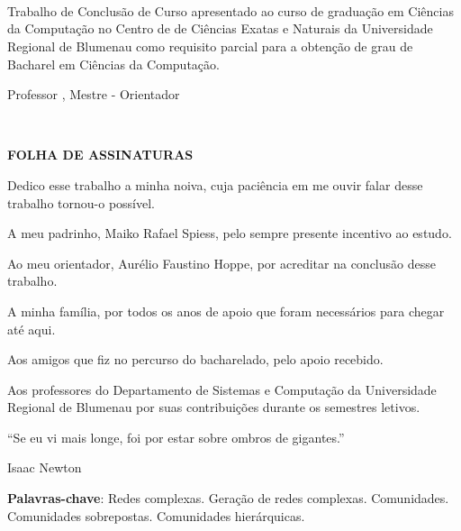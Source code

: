 \documentclass[notes.tex]{subfiles}
\renewcommand{\imprimircapa}{

    \DoubleSpacing

    \begin{centering}

        {\bfseries \MakeUppercase{\imprimirinstituicao}\par}
    
        \vspace*{\fill} \vspace*{\fill} \vspace*{\fill} \vspace*{\fill}
        \vspace*{\fill} \vspace*{\fill} \vspace*{\fill}
    
        {\bfseries\LARGE\MakeUppercase{\imprimirtitulo}}\\
    
        \vspace*{\fill}

        \begin{flushright}
            \bfseries \MakeUppercase{\imprimirautor}
        \end{flushright}   

        \vspace*{\fill} \vspace*{\fill} \vspace*{\fill} \vspace*{\fill}
        \vspace*{\fill} \vspace*{\fill}

        \SingleSpace

        {\bfseries \MakeUppercase{\imprimirlocal} \\ \MakeUppercase{\imprimirdata} }
        \vspace*{\fill}

    \end{centering}
    \pdfbookmark[0]{Capa}{}
    \pagebreak
}
\renewcommand{\imprimirfolhaderosto}{

    \SingleSpace
    \begin{centering}

        {\bfseries \MakeUppercase{\imprimirautor}\par}
    
        \vspace*{\fill} \vspace*{\fill}
    
        {\bfseries\LARGE\MakeUppercase{\imprimirtitulo}}\\
    
        \vspace*{\fill}

        \begin{flushright}
            \parbox{0.5\textwidth}{%
                Trabalho de Conclusão de Curso apresentado ao curso de graduação em Ciências da Computação no Centro de de Ciências Exatas e Naturais da Universidade Regional de Blumenau como requisito parcial para a obtenção de grau de Bacharel em Ciências da Computação.
            }
        \end{flushright}   

        \begin{flushright}
            \parbox{\textwidth*3/5}{%
                Professor \imprimirorientador, Mestre - Orientador
            }
        \end{flushright}   

        \vspace*{\fill} \vspace*{\fill} \vspace*{\fill}
        \vspace*{\fill} \vspace*{\fill} \vspace*{\fill}

        {\bfseries \MakeUppercase{\imprimirlocal} \\ \MakeUppercase{\imprimirdata} }

    \end{centering}
    \pagebreak
}
\newcommand{\imprimirfolhadeassinaturas}{
    \SingleSpace
    \begin{centering}
        \vspace*{\fill} 
        {\bfseries\LARGE\MakeUppercase{Folha de assinaturas}} 
        \vspace*{\fill}
    \end{centering}
    \pagebreak
}
\begin{document}
\imprimircapa

\imprimirfolhaderosto

\imprimirfolhadeassinaturas

\begin{dedicatoria}
    \vspace*{\fill}
    \hfill
    \parbox{0.5\textwidth}{%
        Dedico esse trabalho a minha noiva, cuja paciência em me ouvir falar desse trabalho tornou-o possível.
    }
    \vspace*{\fill}
\end{dedicatoria}
\pagebreak

\DoubleSpacing
\begin{agradecimentos}
    A meu padrinho, Maiko Rafael Spiess, pelo sempre presente incentivo ao estudo.

    Ao meu orientador, Aurélio Faustino Hoppe, por acreditar na conclusão desse trabalho.

    A minha família, por todos os anos de apoio que foram necessários para chegar até aqui.

    Aos amigos que fiz no percurso do bacharelado, pelo apoio recebido.

    Aos professores do Departamento de Sistemas e Computação da Universidade Regional de Blumenau por suas contribuições durante os semestres letivos.
\end{agradecimentos}
\pagebreak

\SingleSpace
\begin{epigrafe}
    \vspace*{\fill}

    \hfill
    \parbox{0.5\textwidth}{%
    ``Se eu vi mais longe, foi por estar sobre ombros de gigantes.''
    }

    \begin{flushright}
    Isaac Newton
    \end{flushright}
    \vspace*{\fill}
\end{epigrafe}

\DoubleSpacing
\begin{resumoumacoluna}
\bigskip

\lipsum[1]

 \vspace{\onelineskip}

 \noindent
 \textbf{Palavras-chave}: Redes complexas. Geração de redes complexas. Comunidades. Comunidades sobrepostas. Comunidades hierárquicas.
\end{resumoumacoluna}
\end{document}
